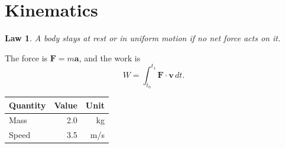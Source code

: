 \documentclass{article}
\newcommand{\vect}[1]{\bm{#1}}
\newtheorem{law}{Law}
\begin{document}
\section*{Kinematics}
\begin{law}
  A body stays at rest or in uniform motion if no net force acts on it.
\end{law}
The force is $\vect{F} = m \vect{a}$, and the work is
\[ W = \int_{t_0}^{t_1} \vect{F} \cdot \vect{v} \, dt. \]
\begin{table}[h]
  \centering
  \begin{tabular}{lrr}
    \toprule
    Quantity & Value & Unit \\
    \midrule
    Mass & 2.0 & kg \\
    Speed & 3.5 & m/s \\
    \bottomrule
  \end{tabular}
\end{table}
\end{document}

